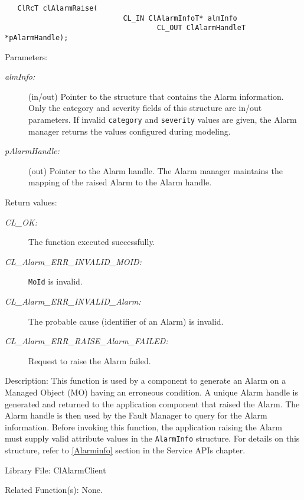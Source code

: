 \begin{flushleft}
\begin{Desc}
\footnotesize\begin{verbatim}   ClRcT clAlarmRaise(
              				CL_IN ClAlarmInfoT* almInfo
              		                CL_OUT ClAlarmHandleT *pAlarmHandle);
\end{verbatim}
\normalsize
\end{Desc}
\begin{Desc}
\item[Parameters:]
\begin{description}
\item[{\em alm\-Info:}](in/out) Pointer to the structure that contains the Alarm information. Only the category and severity fields of this structure
 are in/out parameters. If invalid {\tt{category}} and {\tt{severity}} values are given, the Alarm manager returns the values configured during modeling.
\item[{\em p\-Alarm\-Handle:}](out) Pointer to the Alarm handle. The Alarm manager maintains the mapping of the raised Alarm to the Alarm handle.
\end{description}
\end{Desc}
\begin{Desc}
\item[Return values:]
\begin{description}
\item[{\em CL\_\-OK:}]The function executed successfully. \item[{\em CL\_\-Alarm\_\-ERR\_\-INVALID\_\-MOID:}] {\tt{MoId}} is invalid. 
\item[{\em CL\_\-Alarm\_\-ERR\_\-INVALID\_\-Alarm:}] The probable cause (identifier of an Alarm) is invalid.
\item[{\em CL\_\-Alarm\_\-ERR\_\-RAISE\_\-Alarm\_\-FAILED:}] Request to raise the Alarm failed.\end{description}
\end{Desc}
\begin{Desc}
\item[Description:]This function is used by a component to generate an Alarm on a Managed Object (MO) having an erroneous condition. A unique Alarm 
handle is generated and returned to the application component that raised the Alarm. The Alarm handle is then used by the Fault Manager to query for 
the Alarm information. Before invoking this function, the application raising the Alarm must supply valid
attribute values in the {\tt{AlarmInfo}} structure. For details on this structure, refer to \ref{Alarminfo} section in the Service APIs chapter.
\end{Desc}
\begin{Desc}
\item[Library File:]Cl\-Alarm\-Client\end{Desc}
\begin{Desc}
\item[Related Function(s):]None. \end{Desc}




\end{flushleft}
